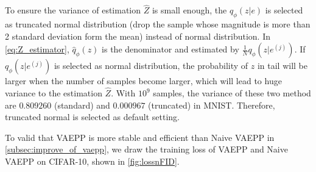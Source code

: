 To ensure the variance of estimation $\hat{Z}$ is small enough, the $q_\phi(z|e)$ is selected as truncated normal distribution (drop the sample whose magnitude is more than 2 standard deviation form the mean) instead of normal distribution. In \cref{eq:Z_estimator}, $\hat{q}_\phi(z)$ is the denominator and estimated by $\frac{1}{N}q_\phi(z|e^{(j)})$. If $q_\phi(z|e^{(j)})$ is selected as normal distribution, the probability of $z$ in tail will be larger when the number of samples become larger, which will lead to huge variance to the estimation $\hat{Z}$. With $10^9$ samples, the variance of these two method are $0.809260$ (standard) and $0.000967$ (truncated) in MNIST. Therefore, truncated normal is selected as default setting. 

To valid that VAEPP is more stable and efficient than Naive VAEPP in \cref{subsec:improve_of_vaepp}, we draw the training loss of VAEPP and Naive VAEPP on CIFAR-10, shown in \cref{fig:lossnFID}.
